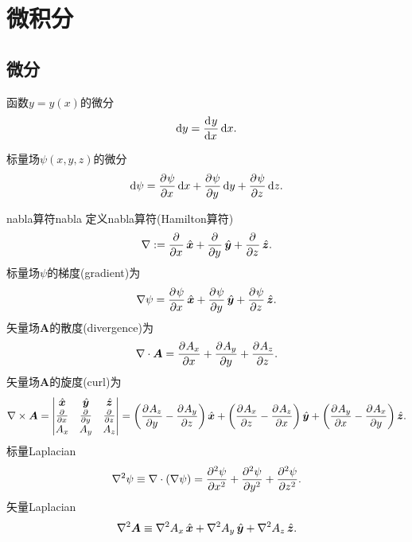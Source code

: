 \section{微积分}
\label{sec:calculus}

\subsection{微分}
\label{ssec:differential calculus}

\begin{compactitem}
	\item 函数$y = y(x)$的微分
    \[
        \d y = \dv yx\d x.
    \]
	\item 标量场$\psi(x,y,z)$的微分
    \begin{equation}
        \d\psi = \pv\psi x\d x + \pv\psi y\d y + \pv\psi z\d z.
    \end{equation}
\end{compactitem}

\begin{definition}
    {nabla算符}{nabla}
    定义nabla算符(Hamilton算符)
    \begin{equation}
        \nabla := \pp x\uvec x + \pp y\uvec y + \pp z\uvec z.
    \end{equation}
    标量场$\psi$的梯度(gradient)为
    \begin{equation}
        \grad\psi = \pv\psi x\uvec x + \pv\psi y\uvec y + \pv\psi z\uvec z.
    \end{equation}
    矢量场$\bm A$的散度(divergence)为
    \begin{equation}
        \div\bm A = \pv{A_x}x + \pv{A_y}y + \pv{A_z}z.
    \end{equation}
    矢量场$\bm A$的旋度(curl)为
    \begin{equation}
        \curl\bm A = \begin{vmatrix}
            \uvec x&\uvec y&\uvec z\\
            \pp x&\pp y&\pp z\\
            A_x&A_y&A_z
        \end{vmatrix}
        = \biggp{\pv{A_z}y - \pv{A_y}z}\uvec x + \biggp{\pv{A_x}z - \pv{A_z}x}\uvec y + \biggp{\pv{A_y}x - \pv{A_x}y}\uvec z.
    \end{equation}
    标量Laplacian
    \begin{equation}
        \laplacian\psi \equiv \div(\grad\psi) = \pv[2]\psi x + \pv[2]\psi y + \pv[2]\psi z.
    \end{equation}
    矢量Laplacian
    \begin{equation}
        \laplacian\bm A \equiv \laplacian A_x\uvec x + \laplacian A_y\uvec y + \laplacian A_z\uvec z.
    \end{equation}
\end{definition}

